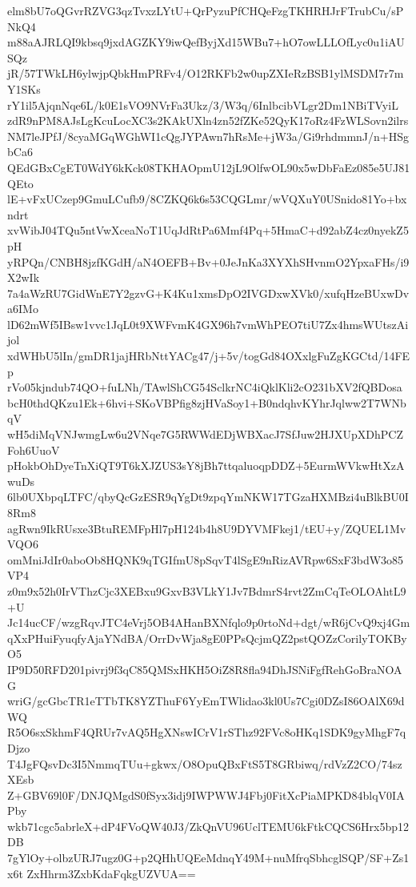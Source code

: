 elm8bU7oQGvrRZVG3qzTvxzLYtU+QrPyzuPfCHQeFzgTKHRHJrFTrubCu/sPNkQ4
m88aAJRLQI9kbsq9jxdAGZKY9iwQefByjXd15WBu7+hO7owLLLOfLyc0u1iAUSQz
jR/57TWkLH6ylwjpQbkHmPRFv4/O12RKFb2w0upZXIeRzBSB1ylMSDM7r7mY1SKs
rY1il5AjqnNqe6L/k0E1sVO9NVrFa3Ukz/3/W3q/6InlbcibVLgr2Dm1NBiTVyiL
zdR9nPM8AJsLgKcuLocXC3s2KAkUXln4zn52fZKe52QyK17oRz4FzWLSovn2ilrs
NM7leJPfJ/8cyaMGqWGhWI1cQgJYPAwn7hRsMe+jW3a/Gi9rhdmmnJ/n+HSgbCa6
QEdGBxCgET0WdY6kKck08TKHAOpmU12jL9OlfwOL90x5wDbFaEz085e5UJ81QEto
lE+vFxUCzep9GmuLCufb9/8CZKQ6k6s53CQGLmr/wVQXuY0USnido81Yo+bxndrt
xvWibJ04TQu5ntVwXceaNoT1UqJdRtPa6Mmf4Pq+5HmaC+d92abZ4cz0nyekZ5pH
yRPQn/CNBH8jzfKGdH/aN4OEFB+Bv+0JeJnKa3XYXhSHvnmO2YpxaFHs/i9X2wIk
7a4aWzRU7GidWnE7Y2gzvG+K4Ku1xmsDpO2IVGDxwXVk0/xufqHzeBUxwDva6IMo
lD62mWf5IBsw1vvc1JqL0t9XWFvmK4GX96h7vmWhPEO7tiU7Zx4hmsWUtszAijol
xdWHbU5lIn/gmDR1jajHRbNttYACg47/j+5v/togGd84OXxlgFuZgKGCtd/14FEp
rVo05kjndub74QO+fuLNh/TAwlShCG54SclkrNC4iQklKli2cO231bXV2fQBDosa
bcH0thdQKzu1Ek+6hvi+SKoVBPfig8zjHVaSoy1+B0ndqhvKYhrJqlww2T7WNbqV
wH5diMqVNJwmgLw6u2VNqe7G5RWWdEDjWBXacJ7SfJuw2HJXUpXDhPCZFoh6UuoV
pHokbOhDyeTnXiQT9T6kXJZUS3sY8jBh7ttqaluoqpDDZ+5EurmWVkwHtXzAwuDs
6lb0UXbpqLTFC/qbyQcGzESR9qYgDt9zpqYmNKW17TGzaHXMBzi4uBlkBU0I8Rm8
agRwn9IkRUsxe3BtuREMFpHl7pH124b4h8U9DYVMFkej1/tEU+y/ZQUEL1MvVQO6
omMniJdIr0aboOb8HQNK9qTGIfmU8pSqvT4lSgE9nRizAVRpw6SxF3bdW3o85VP4
z0m9x52h0IrVThzCjc3XEBxu9GxvB3VLkY1Jv7BdmrS4rvt2ZmCqTeOLOAhtL9+U
Jc14ucCF/wzgRqvJTC4eVrj5OB4AHanBXNfqlo9p0rtoNd+dgt/wR6jCvQ9xj4Gm
qXxPHuiFyuqfyAjaYNdBA/OrrDvWja8gE0PPsQcjmQZ2pstQOZzCorilyTOKByO5
IP9D50RFD201pivrj9f3qC85QMSxHKH5OiZ8R8fla94DhJSNiFgfRehGoBraNOAG
wriG/gcGbcTR1eTTbTK8YZThuF6YyEmTWlidao3kl0Us7Cgi0DZsI86OAlX69dWQ
R5O6sxSkhmF4QRUr7vAQ5HgXNswICrV1rSThz92FVc8oHKq1SDK9gyMhgF7qDjzo
T4JgFQsvDc3I5NmmqTUu+gkwx/O8OpuQBxFtS5T8GRbiwq/rdVzZ2CO/74szXEsb
Z+GBV69l0F/DNJQMgdS0fSyx3idj9IWPWWJ4Fbj0FitXcPiaMPKD84blqV0IAPby
wkb71cgc5abrleX+dP4FVoQW40J3/ZkQnVU96UclTEMU6kFtkCQCS6Hrx5bp12DB
7gYlOy+olbzURJ7ugz0G+p2QHhUQEeMdnqY49M+nuMfrqSbhcglSQP/SF+Zs1x6t
ZxHhrm3ZxbKdaFqkgUZVUA==
